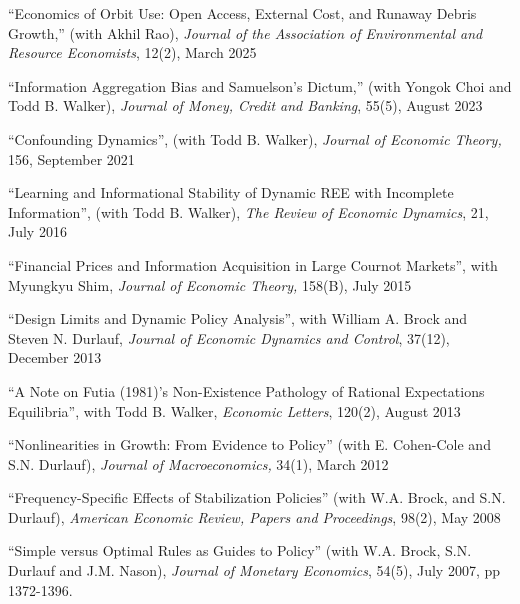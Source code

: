\documentclass[12pt,letterpaper]{article}
\newcommand{\cvblank}{\par\vspace{11pt}}
\newcommand{\cvpaper}[1]{%
  \par\Needspace{3\baselineskip}%
  \begingroup\raggedright\leftskip=0.5in\relax%
  \noindent\llap{-\hspace{0.18in}}#1\par\endgroup}
\begin{document}
\cvpaper{``Economics of Orbit Use: Open Access, External Cost, and Runaway Debris Growth,'' (with Akhil Rao), \textit{Journal of the Association of Environmental and Resource Economists}, 12(2), March 2025}

\cvblank

\cvpaper{``Information Aggregation Bias and Samuelson's Dictum,'' (with Yongok Choi and Todd B. Walker), \textit{Journal of Money, Credit and Banking}, 55(5), August 2023}

\cvblank

\cvpaper{``Confounding Dynamics'', (with Todd B. Walker), \textit{Journal of Economic Theory, }156, September 2021}

\cvblank

\cvpaper{``Learning and Informational Stability of Dynamic REE with Incomplete Information'', (with Todd B. Walker), \textit{The Review of Economic Dynamics}, 21, July 2016}

\cvblank

\cvpaper{``Financial Prices and Information Acquisition in Large Cournot Markets'', with Myungkyu Shim, \textit{Journal of Economic Theory,} 158(B), July 2015}

\cvblank

\cvpaper{``Design Limits and Dynamic Policy Analysis'', with William A. Brock and Steven N. Durlauf, \textit{Journal of Economic Dynamics and Control}, 37(12), December 2013}

\cvblank

\cvpaper{``A Note on Futia (1981)'s Non-Existence Pathology of Rational Expectations Equilibria'', with Todd B. Walker, \textit{Economic Letters}, 120(2), August 2013}

\cvblank

\cvpaper{``Nonlinearities in Growth: From Evidence to Policy'' (with E. Cohen-Cole and S.N. Durlauf), \textit{Journal of Macroeconomics, }34(1), March 2012}

\cvblank

\cvpaper{``Frequency-Specific Effects of Stabilization Policies'' (with W.A. Brock, and S.N. Durlauf), \textit{American Economic Review, Papers and Proceedings}, 98(2), May 2008}

\cvblank

\cvpaper{``Simple versus Optimal Rules as Guides to Policy'' (with W.A. Brock, S.N. Durlauf and J.M. Nason), \textit{Journal of Monetary Economics}, 54(5), July 2007, pp 1372-1396.}

\cvblank
\end{document}
